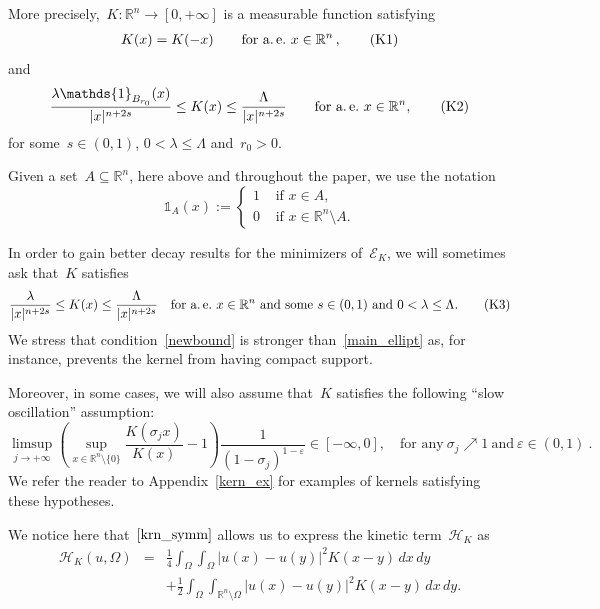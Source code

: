\documentclass[10pt,a4paper]{amsart}
\numberwithin{equation}{section}
\newcommand{\Rn}{\mathbb{R}^n}
\newcommand{\R}{\mathbb{R}}
\newcommand{\Ec}{\mathcal{E}_K}
\newcommand{\Hc}{\mathcal{H}_K}
\renewcommand{\epsilon}{\varepsilon}
\begin{document}
More precisely,~${K}: \Rn \to [0,+\infty]$ is a measurable function satisfying
\begin{align}
K(x)= K(-x) \qquad \text{for a.~\!e.}~x\in \R^n\,, \label{krn_symm}\tag{K1}
\end{align}
and
\begin{align}
\frac{\lambda\mathds{1}_{B_{r_0}}(x)}{|x|^{n+2s}}\leq K(x) \leq \frac{\Lambda}{|x|^{n+2s}} \qquad \text{for a.~\!e.}~x \in \R^n, \label{main_ellipt}\tag{K2} \end{align}
for some~$s\in(0,1)$, $0 <\lambda \leq \Lambda$ and~$ r_0>0$.

Given a set~$A\subseteq \R^n$, here above and throughout the paper, we use the notation
$$ \mathds{1}_{A}(x):=\begin{cases}
1 &{\mbox{ if }} x\in A,\\
0 &{\mbox{ if }} x\in \Rn\setminus A.
\end{cases}
$$

In order to gain better decay results for the minimizers of~$\Ec$, we will sometimes ask that~$K$ satisfies
\begin{equation}\label{newbound}
\frac{\lambda}{|x|^{n+2s}}\leq K(x) \leq \frac{\Lambda}{|x|^{n+2s}} \quad \text{for a.~\!e.}~x \in \R^n~\text{and some}~s\in(0,1)~\text{and}~0 <\lambda \leq \Lambda.\tag{K3}
\end{equation}
We stress that condition~\eqref{newbound} is stronger than~\eqref{main_ellipt} as, for instance, prevents the kernel from having compact support.

Moreover, in some cases, we will also assume that~$K$ satisfies the following 
``slow oscillation'' assumption:
\begin{equation}
\limsup_{j \to +\infty}\left(\sup_{x \in \R^n \setminus \{0\}} \frac{K(\sigma_j x)}{K(x)} -1\right) \frac{1}{(1-\sigma_j)^{1-\epsilon}}\in [-\infty, 0], \quad\text{for any}~\sigma_j \nearrow 1~\text{and}~\epsilon \in (0,1) \ \label{nuovissima}\tag{K4}.
\end{equation}
We refer the reader to Appendix~\ref{kern_ex} for examples of kernels satisfying these hypotheses.

We notice here that~$\eqref{krn_symm}$ allows us to express the kinetic term~$\Hc$ as
\begin{eqnarray*}
\Hc(u,\Omega) &=&\frac{1}{4} \int_{\Omega} \int_{\Omega} | u(x)-u(y) |^2 K(x-y) \, dx \, dy \\
&& + \frac{1}{2} \int_{\Omega}  \int_{\R^n\setminus\Omega} |u(x)-u(y) |^2 K(x-y) \, dx \, dy.
\end{eqnarray*}
\end{document}
